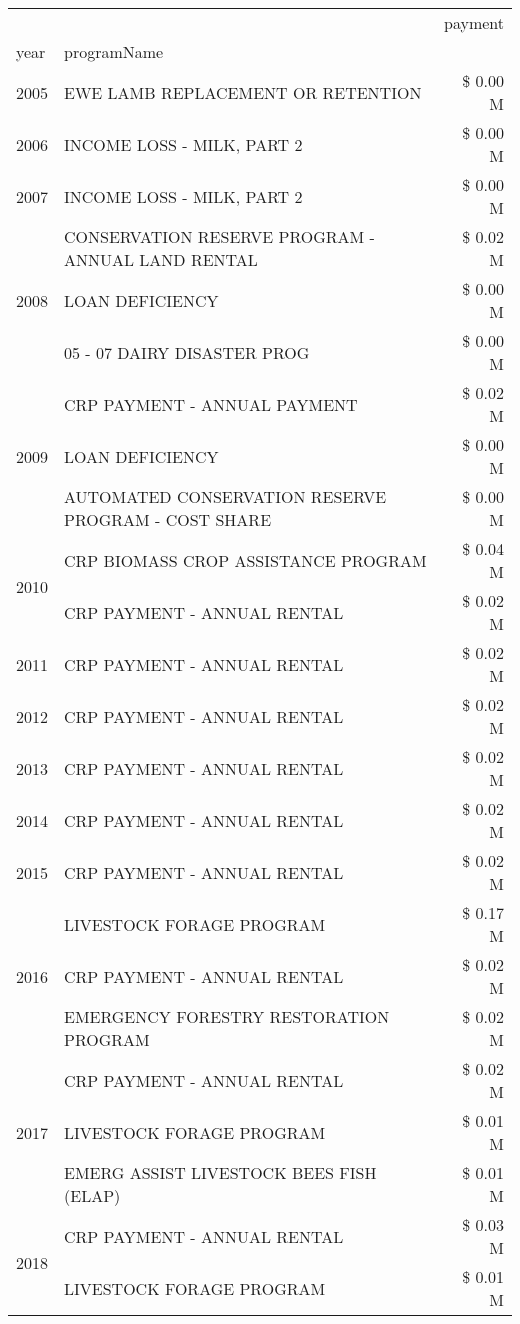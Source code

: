 \begin{tabular}{llr}
\toprule
 &  & payment \\
year & programName &  \\
\midrule
2005 & EWE LAMB REPLACEMENT OR RETENTION & \$ 0.00 M \\
\cline{1-3}
2006 & INCOME LOSS - MILK, PART 2 & \$ 0.00 M \\
\cline{1-3}
2007 & INCOME LOSS - MILK, PART 2 & \$ 0.00 M \\
\cline{1-3}
\multirow[t]{3}{*}{2008} & CONSERVATION RESERVE PROGRAM - ANNUAL LAND RENTAL & \$ 0.02 M \\
 & LOAN DEFICIENCY & \$ 0.00 M \\
 & 05 - 07 DAIRY DISASTER PROG & \$ 0.00 M \\
\cline{1-3}
\multirow[t]{3}{*}{2009} & CRP PAYMENT - ANNUAL PAYMENT & \$ 0.02 M \\
 & LOAN DEFICIENCY & \$ 0.00 M \\
 & AUTOMATED CONSERVATION RESERVE PROGRAM - COST SHARE & \$ 0.00 M \\
\cline{1-3}
\multirow[t]{2}{*}{2010} & CRP BIOMASS CROP ASSISTANCE PROGRAM & \$ 0.04 M \\
 & CRP PAYMENT - ANNUAL RENTAL & \$ 0.02 M \\
\cline{1-3}
2011 & CRP PAYMENT - ANNUAL RENTAL & \$ 0.02 M \\
\cline{1-3}
2012 & CRP PAYMENT - ANNUAL RENTAL & \$ 0.02 M \\
\cline{1-3}
2013 & CRP PAYMENT - ANNUAL RENTAL & \$ 0.02 M \\
\cline{1-3}
2014 & CRP PAYMENT - ANNUAL RENTAL & \$ 0.02 M \\
\cline{1-3}
2015 & CRP PAYMENT - ANNUAL RENTAL & \$ 0.02 M \\
\cline{1-3}
\multirow[t]{3}{*}{2016} & LIVESTOCK FORAGE PROGRAM & \$ 0.17 M \\
 & CRP PAYMENT - ANNUAL RENTAL & \$ 0.02 M \\
 & EMERGENCY FORESTRY RESTORATION PROGRAM & \$ 0.02 M \\
\cline{1-3}
\multirow[t]{3}{*}{2017} & CRP PAYMENT - ANNUAL RENTAL & \$ 0.02 M \\
 & LIVESTOCK FORAGE PROGRAM & \$ 0.01 M \\
 & EMERG ASSIST LIVESTOCK BEES FISH (ELAP) & \$ 0.01 M \\
\cline{1-3}
\multirow[t]{3}{*}{2018} & CRP PAYMENT - ANNUAL RENTAL & \$ 0.03 M \\
 & LIVESTOCK FORAGE PROGRAM & \$ 0.01 M \\

\end{tabular}
